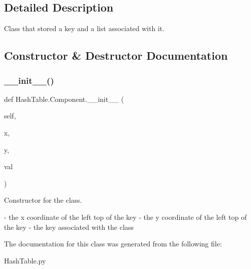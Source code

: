 \subsection{Detailed Description}
Class that stored a key and a list associated with it. 

\subsection{Constructor \& Destructor Documentation}
\mbox{\label{class_hash_table_1_1_component_ad467b4ea0187c36b98a463258c18a30e}} 
\subsubsection{\texorpdfstring{\+\_\+\+\_\+init\+\_\+\+\_\+()}{\_\_init\_\_()}}
{\footnotesize\ttfamily def Hash\+Table.\+Component.\+\_\+\+\_\+init\+\_\+\+\_\+ (\begin{DoxyParamCaption}\item[{}]{self,  }\item[{}]{x,  }\item[{}]{y,  }\item[{}]{val }\end{DoxyParamCaption})}



Constructor for the class. 

-\/ the x coordinate of the left top of the key  -\/ the y coordinate of the left top of the key  -\/ the key associated with the class 

The documentation for this class was generated from the following file\+:\begin{DoxyCompactItemize}
\item 
Hash\+Table.\+py\end{DoxyCompactItemize}
